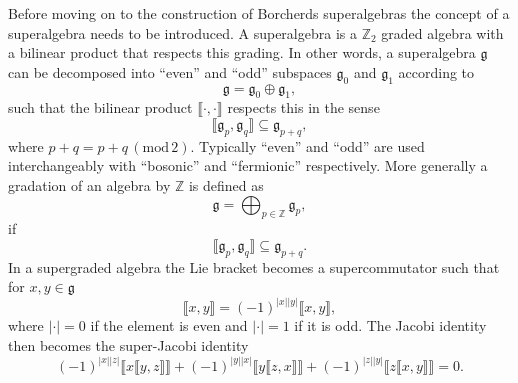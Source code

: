 Before moving on to the construction of Borcherds superalgebras the concept of a superalgebra needs to be introduced. A superalgebra is a $\mathbb{Z}_2$ graded algebra with a bilinear product that respects this grading. In other words, a superalgebra $\mathfrak{g}$ can be decomposed into ``even'' and ``odd'' subspaces $\mathfrak{g}_0$ and $\mathfrak{g}_1$ according to 
\begin{equation}
    \mathfrak{g} = \mathfrak{g}_0\oplus\mathfrak{g}_1,
\end{equation}
such that the bilinear product $\llbracket\cdot,\cdot\rrbracket$ respects this in the sense
\begin{equation}
    \llbracket\mathfrak{g}_p,\mathfrak{g}_q\rrbracket \subseteq \mathfrak{g}_{p+q},
\end{equation}
where $p+q = p+q\,(\text{mod}\,2)$. Typically ``even'' and ``odd'' are used interchangeably with ``bosonic'' and ``fermionic'' respectively. More generally a gradation of an algebra by $\mathbb{Z}$ is defined as 
\begin{equation}
    \mathfrak{g} = \bigoplus_{p\in\mathbb{Z}} \mathfrak{g}_{p},
\end{equation}
if
\begin{equation}
    \llbracket \mathfrak{g}_p,\mathfrak{g}_q\rrbracket\subseteq \mathfrak{g}_{p+q}.
\end{equation}
In a supergraded algebra the Lie bracket becomes a supercommutator such that for $x,y\in\mathfrak{g}$
\begin{equation}
    \llbracket x,y\rrbracket = \left(-1\right)^{|x||y|}\llbracket x,y\rrbracket,
\end{equation}
where $|\cdot|=0$ if the element is even and $|\cdot|=1$ if it is odd. The Jacobi identity then becomes the super-Jacobi identity
\begin{equation}
    \left(-1\right)^{|x||z|}\llbracket x\llbracket y,z\rrbracket\rrbracket +\left(-1\right)^{|y||x|}\llbracket y\llbracket z,x\rrbracket\rrbracket+\left(-1\right)^{|z||y|}\llbracket z\llbracket x,y\rrbracket\rrbracket = 0.
\end{equation}

